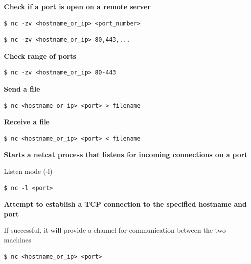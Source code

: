 \documentclass{article}
\newenvironment{codetemplate}[1][]{%
  \mybasecolorbox[#1]
  \itshape
}{%
  \endmybasecolorbox
}
\begin{document}
\textbf{Check if a port is open on a remote server}
\begin{codetemplate}
\begin{verbatim}
$ nc -zv <hostname_or_ip> <port_number>
\end{verbatim}
\end{codetemplate}

\begin{codetemplate}
\begin{verbatim}
$ nc -zv <hostname_or_ip> 80,443,...
\end{verbatim}
\end{codetemplate}


\textbf{Check range of ports}
\begin{codetemplate}{}
\begin{verbatim}
$ nc -zv <hostname_or_ip> 80-443
\end{verbatim}
\end{codetemplate}

\textbf{Send a file}
\begin{codetemplate}{}
\begin{verbatim}
$ nc <hostname_or_ip> <port> > filename
\end{verbatim}
\end{codetemplate}

\textbf{Receive a file}
\begin{codetemplate}{}
\begin{verbatim}
$ nc <hostname_or_ip> <port> < filename
\end{verbatim}
\end{codetemplate}

\textbf{Starts a netcat process that listens for incoming connections on a port}

Listen mode (-l)
\begin{codetemplate}{}
\begin{verbatim}
$ nc -l <port>
\end{verbatim}
\end{codetemplate}

\textbf{Attempt to establish a TCP connection to the specified hostname and port}

If successful, it will provide a channel for communication between the two machines
\begin{codetemplate}{}
\begin{verbatim}
$ nc <hostname_or_ip> <port>
\end{verbatim}
\end{codetemplate}
\end{document}
